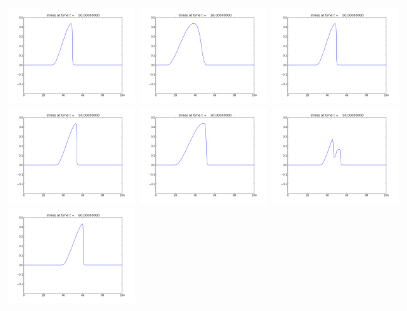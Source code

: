 \documentclass{article}
\begin{document}
\begin{figure}
  \includegraphics[width=0.3\textwidth]{homo1.png}
  \includegraphics[width=0.3\textwidth]{sound1.png}
  \includegraphics[width=0.3\textwidth]{reflect1.png}\\
  \includegraphics[width=0.3\textwidth]{homo2.png}
  \includegraphics[width=0.3\textwidth]{sound2.png}
  \includegraphics[width=0.3\textwidth]{reflect2.png}\\
  \includegraphics[width=0.3\textwidth]{homo3.png}

\end{figure}
\end{document}
